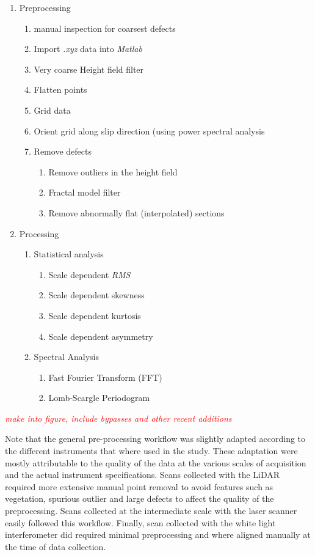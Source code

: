 \documentclass[12pt,a4paper]{article}
\begin{document}
\begin{enumerate}
	\item Preprocessing
	\begin{enumerate}
		\item manual inspection for coarsest defects
		\item Import \textit{.xyz} data into \textit{Matlab}
		\item Very coarse Height field filter
		\item Flatten points
		\item Grid data
		\item Orient grid along slip direction (using power spectral analysis 
		\item Remove defects
		\begin{enumerate}
			\item Remove outliers in the height field
			\item Fractal model filter
			\item Remove abnormally flat (interpolated) sections
		\end{enumerate}
	\end{enumerate}
	\item Processing
	\begin{enumerate}
		\item Statistical analysis
		\begin{enumerate}
			\item Scale dependent \textit{RMS}
			\item Scale dependent skewness
			\item Scale dependent kurtosis
			\item Scale dependent asymmetry
		\end{enumerate}
		\item Spectral Analysis
		\begin{enumerate}
			\item Fast Fourier Transform (FFT)
			\item Lomb-Scargle Periodogram
		\end{enumerate}
	\end{enumerate}
\end{enumerate}

\textcolor{red}{\textit{make into figure, include bypasses and other recent additions}}  

  
Note that the general pre-processing workflow was slightly adapted according to the different instruments that where used in the study. These adaptation were mostly attributable to the quality of the data at the various scales of acquisition and the actual instrument specifications. Scans collected with the LiDAR required more extensive manual point removal to avoid features such as vegetation, spurious outlier and large defects to affect the quality of the preprocessing. Scans collected at the intermediate scale with the laser scanner easily followed this workflow. Finally, scan collected with the white light interferometer did required minimal preprocessing and where aligned manually at the time of data collection. 
\end{document}
